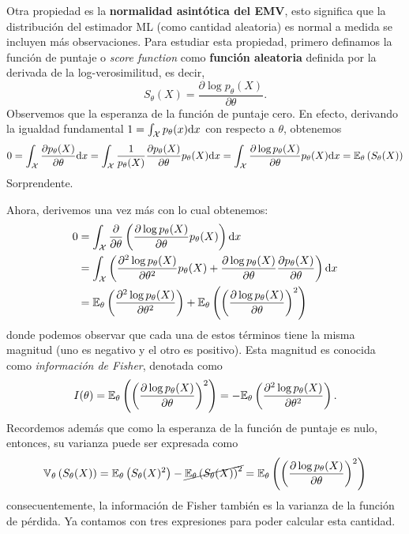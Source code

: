Otra propiedad es la \textbf{normalidad asintótica del EMV}, esto significa que la distribución del estimador ML (como cantidad aleatoria) es normal a medida se incluyen más observaciones. Para estudiar esta propiedad, primero definamos la función de puntaje o \textit{score function} como \textbf{función aleatoria }definida por la derivada de la log-verosimilitud, es decir, 
\begin{equation}
	S_\theta(X) = \frac{\partial \log p_\theta(X)}{\partial\theta}.
\end{equation}
Observemos que la esperanza de la función de puntaje cero. En efecto, derivando la igualdad fundamental $1 = \int_{\mathcal X} p_\theta(x){\text{d}x}$ con respecto a $\theta$, obtenemos 
\begin{align}
	0 = \int_{\mathcal X} \frac{\partial  p_\theta(X)}{\partial\theta} {\text{d}x} = \int_{\mathcal X} \frac{1}{p_\theta(X)}\frac{\partial  p_\theta(X)}{\partial\theta} p_\theta(X) {\text{d}x} = \int_{\mathcal X} \frac{\partial \log   p_\theta(X)}{\partial\theta} p_\theta(X) {\text{d}x} = \mathbb{E}_\theta \left(S_\theta(X)\right)
\end{align}
Sorprendente. 

Ahora, derivemos una vez más con lo cual obtenemos: 
\begin{align*}
	0 &= \int_{\mathcal X} \frac{\partial}{\partial \theta }\left(\frac{\partial \log   p_\theta(X)}{\partial\theta} p_\theta(X) \right){\text{d}x}\\ 
	&= \int_{\mathcal X} \left(\frac{\partial^2 \log   p_\theta(X)}{\partial\theta^2} p_\theta(X) + \frac{\partial \log   p_\theta(X)}{\partial\theta}\frac{\partial   p_\theta(X)}{\partial\theta}  \right){\text{d}x}\\
	&= \mathbb{E}_\theta \left(\frac{\partial^2 \log   p_\theta(X)}{\partial\theta^2}\right) + \mathbb{E}_\theta \left(\left(\frac{\partial \log   p_\theta(X)}{\partial\theta}\right)^2\right)
\end{align*}
donde podemos observar que cada una de estos términos tiene la misma magnitud (uno es negativo y el otro es positivo). Esta magnitud es conocida como \textit{información de Fisher}, denotada como 
\begin{equation}
		I(\theta) = \mathbb{E}_\theta \left(\left(\frac{\partial \log   p_\theta(X)}{\partial\theta}\right)^2\right) = 	-\mathbb{E}_\theta \left(\frac{\partial^2 \log   p_\theta(X)}{\partial\theta^2}\right).
\end{equation}	
Recordemos además que como la esperanza de la función de puntaje es nulo, entonces, su varianza puede ser expresada como 
\begin{equation}
	\mathbb{V}_\theta \left(S_\theta(X)\right) = \mathbb{E}_\theta \left(S_\theta(X)^2\right) - \cancel{\mathbb{E}_\theta \left(S_\theta(X)\right)^2} = \mathbb{E}_\theta \left(\left(\frac{\partial \log   p_\theta(X)}{\partial\theta}\right)^2\right)
\end{equation}
consecuentemente, la información de Fisher también es la varianza de la función de pérdida. Ya contamos con tres expresiones para poder calcular esta cantidad. 

